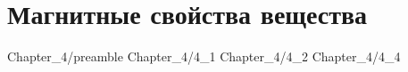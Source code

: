 \chapter{Магнитные свойства вещества}

 {Chapter_4/preamble}
 {Chapter_4/4_1}
 {Chapter_4/4_2}
 {Chapter_4/4_4}